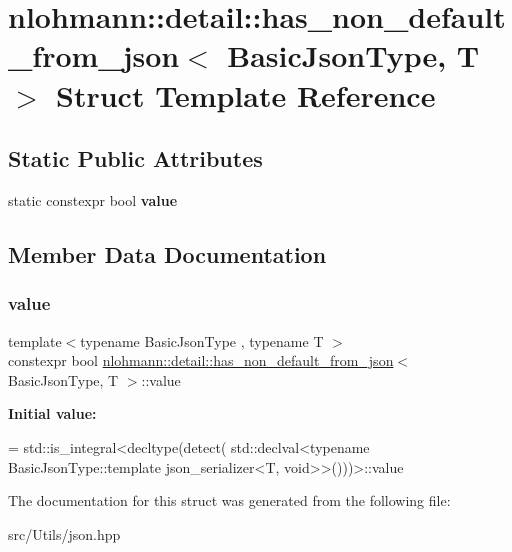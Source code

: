 \hypertarget{structnlohmann_1_1detail_1_1has__non__default__from__json}{}\section{nlohmann\+:\+:detail\+:\+:has\+\_\+non\+\_\+default\+\_\+from\+\_\+json$<$ Basic\+Json\+Type, T $>$ Struct Template Reference}
\label{structnlohmann_1_1detail_1_1has__non__default__from__json}
\subsection*{Static Public Attributes}
\begin{DoxyCompactItemize}
\item 
static constexpr bool {\bfseries value}
\end{DoxyCompactItemize}


\subsection{Member Data Documentation}
\mbox{\label{structnlohmann_1_1detail_1_1has__non__default__from__json_ad34bb7cd3961fcafc2c5047a9782e931}} 
\subsubsection{\texorpdfstring{value}{value}}
{\footnotesize\ttfamily template$<$typename Basic\+Json\+Type , typename T $>$ \\
constexpr bool \mbox{\hyperlink{structnlohmann_1_1detail_1_1has__non__default__from__json}{nlohmann\+::detail\+::has\+\_\+non\+\_\+default\+\_\+from\+\_\+json}}$<$ Basic\+Json\+Type, T $>$\+::value\hspace{0.3cm}{\ttfamily [static]}}

{\bfseries Initial value\+:}
\begin{DoxyCode}
= std::is\_integral<decltype(detect(
                                      std::declval<\textcolor{keyword}{typename} BasicJsonType::template json\_serializer<T,
       void>>()))>::value
\end{DoxyCode}


The documentation for this struct was generated from the following file\+:\begin{DoxyCompactItemize}
\item 
src/\+Utils/json.\+hpp\end{DoxyCompactItemize}
